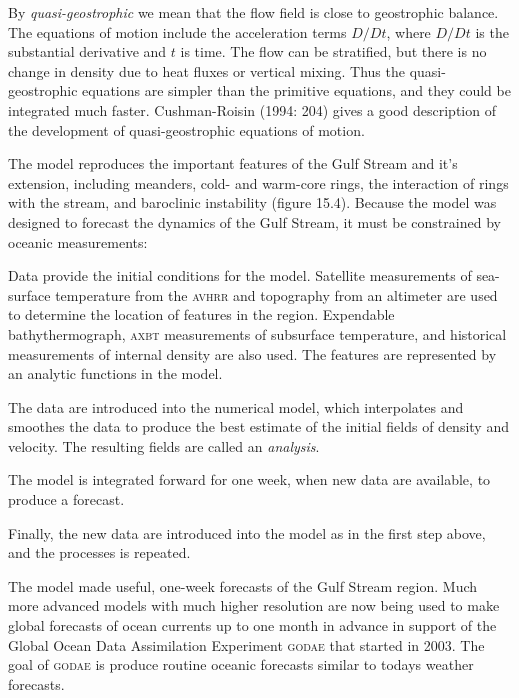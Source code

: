 By \textit{quasi-geostrophic} we mean
that the flow field is close to geostrophic balance. The equations of
motion include the acceleration terms $D/Dt$, where $D/Dt$ is the
substantial derivative and $t$ is time. The flow can be stratified,
but there is no change in density due to heat fluxes
or vertical mixing. Thus the quasi-geostrophic equations are
simpler than the primitive equations, and they could be integrated
much faster. Cushman-Roisin (1994: 204) gives a good description of
the development of quasi-geostrophic equations of motion.

The model reproduces the important features of the Gulf
Stream and it's extension, including
meanders, cold- and warm-core rings, the interaction of rings with the
stream, and baroclinic instability (figure 15.4). Because the model
was designed to forecast the dynamics of the Gulf Stream, it must be
constrained by oceanic measurements:
\begin{enumerate}
\vitem Data provide the initial conditions for the model. Satellite
measurements of sea-surface temperature from the \textsc{avhrr}
and topography
from an altimeter are used to determine the location of features in
the region.  Expendable bathythermograph, \textsc{axbt} measurements of subsurface
temperature, and historical measurements of internal density are also
used. The features are represented by an analytic functions in the
model.

\vitem The data are introduced into the numerical model, which
interpolates and smoothes the data to produce the best estimate of the
initial fields of density and velocity. The resulting fields are
called an \textit{analysis}.

\vitem The model is integrated forward for one week, when new data are
available, to produce a forecast.

\vitem Finally, the new data are introduced into the model as in the
first step above, and the processes is repeated.
\end{enumerate}
The model made useful, one-week forecasts of the Gulf
Stream region. Much more advanced models
with much higher resolution are now being used to make global
forecasts of ocean currents up to one month in advance in support of
the Global Ocean Data Assimilation Experiment
\textsc{godae}  that started in 2003. The goal of
\textsc{godae} is produce routine oceanic forecasts similar to todays
weather forecasts.

